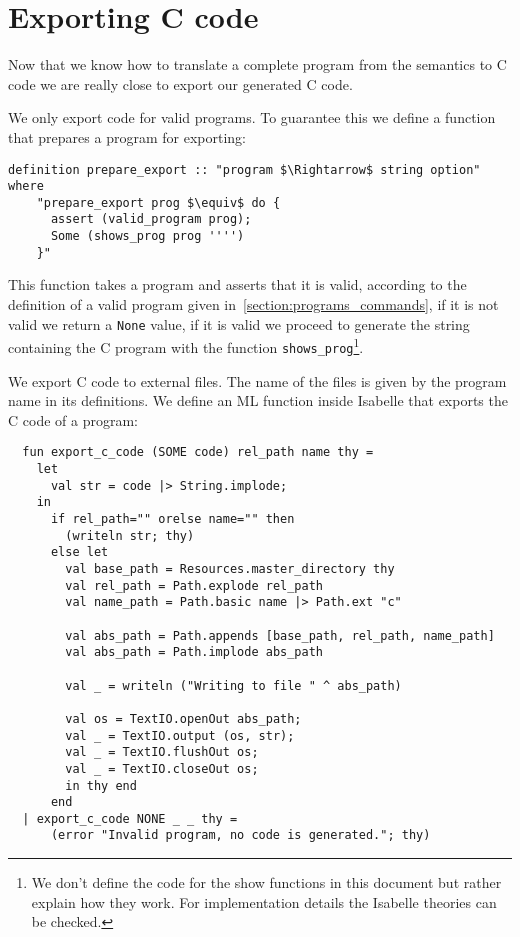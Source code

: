 \section{Exporting C code}\label{section:exporting_c_code}

Now that we know how to translate a complete program from the semantics to C code we are really close to export our generated C code.

We only export code for valid programs.
To guarantee this we define a function that prepares a program for exporting:

\begin{lstlisting}[mathescape=true]
  definition prepare_export :: "program $\Rightarrow$ string option" where
    "prepare_export prog $\equiv$ do {
      assert (valid_program prog);
      Some (shows_prog prog '''')
    }"
\end{lstlisting}


This function takes a program and asserts that it is valid, according to the definition of a valid program given in~\ref{section:programs_commands}, if it is not valid we return a \verb|None| value, if it is valid we proceed to generate the string containing the C program with the function \verb|shows_prog|\footnote{We don't define the code for the show functions in this document but rather explain how they work. For implementation details the Isabelle theories can be checked.}.

We export C code to external files.
The name of the files is given by the program name in its definitions.
We define an ML function inside Isabelle that exports the C code of a program:


\begin{lstlisting}
  fun export_c_code (SOME code) rel_path name thy =
    let
      val str = code |> String.implode;
    in
      if rel_path="" orelse name="" then
        (writeln str; thy)
      else let
        val base_path = Resources.master_directory thy
        val rel_path = Path.explode rel_path
        val name_path = Path.basic name |> Path.ext "c"

        val abs_path = Path.appends [base_path, rel_path, name_path]
        val abs_path = Path.implode abs_path

        val _ = writeln ("Writing to file " ^ abs_path)

        val os = TextIO.openOut abs_path;
        val _ = TextIO.output (os, str);
        val _ = TextIO.flushOut os;
        val _ = TextIO.closeOut os;
        in thy end
      end
  | export_c_code NONE _ _ thy =
      (error "Invalid program, no code is generated."; thy)
\end{lstlisting}

